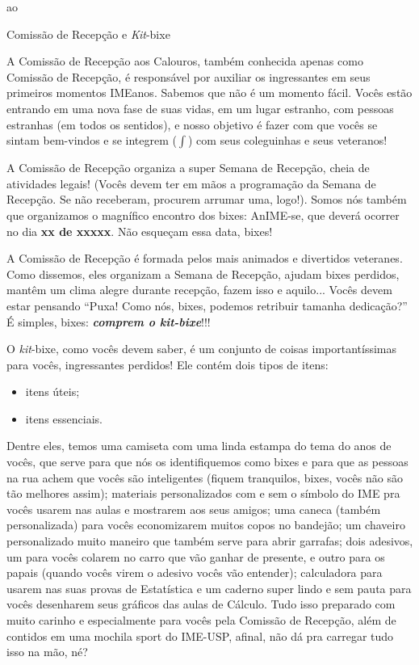 ao\begin{secao}{Comissão de Recepção e \textit{Kit}-bixe}

A Comissão de Recepção aos Calouros, também conhecida apenas como Comissão de 
Recepção, é responsável por auxiliar os ingressantes em seus primeiros momentos 
IMEanos. Sabemos que não é um momento fácil. Vocês estão entrando em uma nova fase 
de suas vidas, em um lugar estranho, com pessoas estranhas (em todos os sentidos),
e nosso objetivo é fazer com que vocês se sintam bem-vindos e se integrem
($\int$) com seus coleguinhas e seus veteranos!

A Comissão de Recepção organiza a super Semana de Recepção, cheia de atividades
legais! (Vocês devem ter em mãos a programação da Semana de Recepção. 
Se não receberam, procurem arrumar uma, logo!).
Somos nós também que organizamos o magnífico encontro dos bixes: AnIME-se, que 
deverá ocorrer no dia \textbf{xx de xxxxx}. Não esqueçam essa data, bixes! %

A Comissão de Recepção é formada pelos mais animados e divertidos veteranes. Como
dissemos, eles organizam a Semana de Recepção, ajudam bixes perdidos, mantêm um clima
alegre durante recepção, fazem isso e aquilo...
Vocês devem estar pensando ``Puxa! Como nós, bixes, podemos retribuir
tamanha dedicação?'' É simples, bixes: {\bf\em comprem o \textit{kit}-bixe}!!!

O \textit{kit}-bixe, como vocês devem saber, é um conjunto de coisas
importantíssimas para vocês, ingressantes perdidos! Ele contém dois tipos de
itens:
\begin{itemize}
\item itens úteis;
\item itens essenciais.
\end{itemize} %
Dentre eles, temos uma camiseta com uma linda estampa do tema do anos de vocês,
que serve para que nós os identifiquemos como bixes e para que as pessoas na 
rua achem que vocês são inteligentes (fiquem tranquilos, bixes, vocês não são 
tão melhores assim); materiais personalizados com e sem o símbolo do IME pra 
vocês usarem nas aulas e mostrarem aos seus amigos; uma caneca (também personalizada) 
para vocês economizarem muitos copos no bandejão; um chaveiro personalizado muito 
maneiro que também serve para abrir garrafas;
dois adesivos, um para vocês colarem no carro que vão ganhar de presente, e outro
para os papais (quando vocês virem o adesivo vocês vão entender); calculadora para 
usarem nas suas provas de Estatística e um caderno super
lindo e sem pauta para vocês desenharem seus gráficos das aulas de Cálculo. Tudo
isso preparado com muito carinho e especialmente para vocês pela Comissão de Recepção,
além de contidos em uma mochila sport do IME-USP, afinal, não dá pra
carregar tudo isso na mão, né?


\end{secao}
